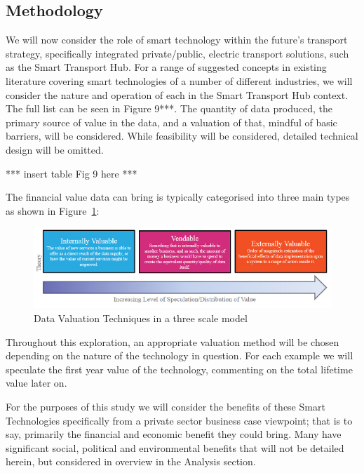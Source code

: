 \documentclass[conference]{IEEEtran}
\begin{document}
\subsection{Methodology}

We will now consider the role of smart technology within the future’s
transport strategy, specifically integrated private/public, electric
transport solutions, such as the Smart Transport Hub. For a range of
suggested concepts in existing literature covering smart technologies
of a number of different industries, we will consider the nature and
operation of each in the Smart Transport Hub context. The full list
can be seen in Figure 9***. The quantity of data produced, the primary
source of value in the data, and a valuation of that, mindful of basic
barriers, will be considered. While feasibility will be considered,
detailed technical design will be omitted.

*** insert table Fig 9 here ***

The financial value data can bring is typically categorised into three
main types as shown in Figure~\ref{fig:datavaltechniques}:

\begin{figure}[!htp]
\centering
\includegraphics[width=\textwidth]{images/datavaltechniques.png}
\caption{Data Valuation Techniques in a three scale model}
\label{fig:datavaltechniques}
\end{figure}

Throughout this exploration, an appropriate valuation method will be
chosen depending on the nature of the technology in question. For each
example we will speculate the first year value of the technology,
commenting on the total lifetime value later on.

For the purposes of this study we will consider the benefits of these
Smart Technologies specifically from a private sector business case
viewpoint; that is to say, primarily the financial and economic
benefit they could bring. Many have significant social, political and
environmental benefits that will not be detailed herein, but
considered in overview in the Analysis section.
\end{document}
